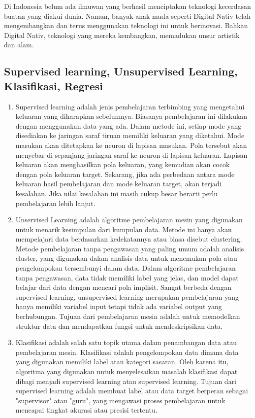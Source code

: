 \hspace{1cm}Di Indonesia belum ada ilmuwan yang berhasil menciptakan teknologi kecerdasan buatan yang diakui dunia. Namun, banyak anak muda seperti Digital Nativ telah mengembangkan dan terus menggunakan teknologi ini untuk berinovasi. Bahkan Digital Nativ, teknologi yang mereka kembangkan, memadukan unsur artistik dan alam.


\subsection{Supervised learning, Unsupervised Learning, Klasifikasi, Regresi}
\begin{enumerate}
     \item Supervised learning adalah jenis pembelajaran terbimbing yang mengetahui keluaran yang diharapkan sebelumnya. Biasanya pembelajaran ini dilakukan dengan menggunakan data yang ada. Dalam metode ini, setiap mode yang disediakan ke jaringan saraf tiruan memiliki keluaran yang diketahui. Mode masukan akan ditetapkan ke neuron di lapisan masukan. Pola tersebut akan menyebar di sepanjang jaringan saraf ke neuron di lapisan keluaran. Lapisan keluaran akan menghasilkan pola keluaran, yang kemudian akan cocok dengan pola keluaran target. Sekarang, jika ada perbedaan antara mode keluaran hasil pembelajaran dan mode keluaran target, akan terjadi kesalahan. Jika nilai kesalahan ini masih cukup besar berarti perlu pembelajaran lebih lanjut.
     
     \item Unservised Learning adalah algoritme pembelajaran mesin yang digunakan untuk menarik kesimpulan dari kumpulan data. Metode ini hanya akan mempelajari data berdasarkan kedekatannya atau biasa disebut clustering. Metode pembelajaran tanpa pengawasan yang paling umum adalah analisis cluster, yang digunakan dalam analisis data untuk menemukan pola atau pengelompokan tersembunyi dalam data. Dalam algoritme pembelajaran tanpa pengawasan, data tidak memiliki label yang jelas, dan model dapat belajar dari data dengan mencari pola implisit. Sangat berbeda dengan supervised learning, unsupervised learning merupakan pembelajaran yang hanya memiliki variabel input tetapi tidak ada variabel output yang berhubungan. Tujuan dari pembelajaran mesin adalah untuk memodelkan struktur data dan mendapatkan fungsi untuk mendeskripsikan data.

    \item Klasifikasi adalah salah satu topik utama dalam penambangan data atau pembelajaran mesin. Klasifikasi adalah pengelompokan data dimana data yang digunakan memiliki label atau kategori sasaran. Oleh karena itu, algoritma yang digunakan untuk menyelesaikan masalah klasifikasi dapat dibagi menjadi supervised learning atau supervised learning. Tujuan dari supervised learning adalah membuat label atau data target berperan sebagai "supervisor" atau "guru", yang mengawasi proses pembelajaran untuk mencapai tingkat akurasi atau presisi tertentu.
    

\end{enumerate}
